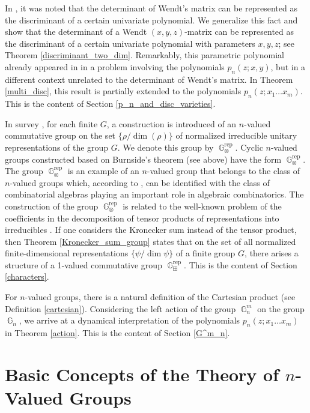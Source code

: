 \documentclass[14pt, dvipsnames]{extarticle}
\theoremstyle{definition}
\theoremstyle{definition}
\theoremstyle{remark}
\DeclareMathOperator{\G}{\mathbb{G}}
\DeclareMathOperator{\rep}{\mathrm{rep}}
\begin{document}
In \cite[Proposition 1]{Helou}, it was noted that the determinant of Wendt's matrix can be represented as the discriminant of a certain univariate polynomial. We generalize this fact and show that the determinant of a Wendt $(x, y, z)$-matrix can be represented as the discriminant of a certain univariate polynomial with parameters $x, y, z$; see Theorem \ref{discriminant_two_dim}. Remarkably, this parametric polynomial already appeared in \cite[Theorem 2.3]{Gaiur} in a problem involving the polynomials $p_n(z; x, y)$, but in a different context unrelated to the determinant of Wendt's matrix. In Theorem \ref{multi_disc}, this result is partially extended to the polynomials $p_n(z; x_1\dots x_m)$. This is the content of Section \ref{p_n_and_disc_varieties}.

In survey \cite{Buchstaber}, for each finite $G$, a construction is introduced of an $n$-valued commutative group on the set $\{\rho/\dim(\rho)\}$ of normalized irreducible unitary representations of the group $G$. We denote this group by $\G^{\rep}_{\otimes}$. Cyclic $n$-valued groups constructed based on Burnside’s theorem (see above) have the form $\G^{\rep}_{\otimes}$. The group $\G^{\rep}_{\otimes}$ is an example of an $n$-valued group that belongs to the class of $n$-valued groups which, according to \cite{Vershik}, can be identified with the class of combinatorial algebras playing an important role in algebraic combinatorics. The construction of the group $\G^{\rep}_{\otimes}$ is related to the well-known problem of the coefficients in the decomposition of tensor products of representations into irreducibles \cite{Littlewood06}. If one considers the Kronecker sum instead of the tensor product, then Theorem \ref{Kronecker_sum_group} states that on the set of all normalized finite-dimensional representations $\{\psi/\dim\psi\}$ of a finite group $G$, there arises a structure of a 1-valued commutative group $\G^{\rep}_{\boxplus}$. This is the content of Section \ref{characters}.

For $n$-valued groups, there is a natural definition of the Cartesian product (see Definition \ref{cartesian}). Considering the left action of the group $\G^m_n$ on the group $\G_n$, we arrive at a dynamical interpretation of the polynomials $p_n(z; x_1\dots x_m)$ in Theorem \ref{action}. This is the content of Section \ref{G^m_n}.









\section{Basic Concepts of the Theory of $n$-Valued Groups}\label{Basic_concepts_of_n_val}
\end{document}
